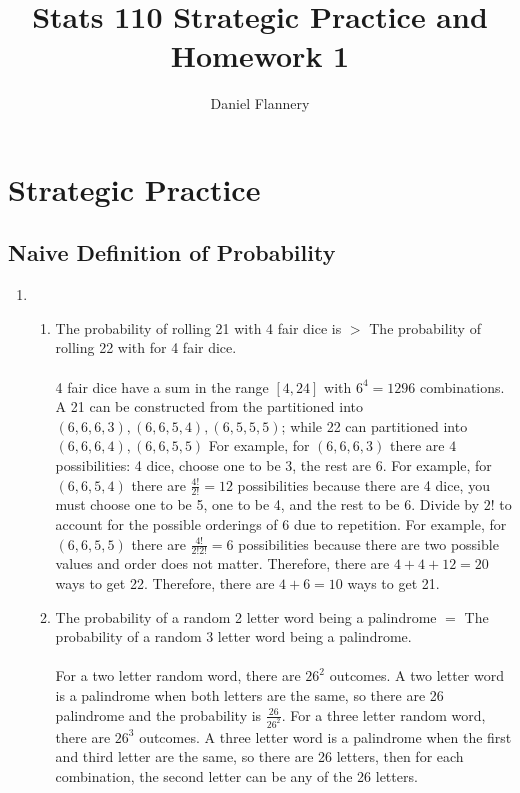 \documentclass[11pt, oneside]{article}   	%
\title{Stats 110 Strategic Practice and Homework 1}
\author{Daniel Flannery}
\begin{document}
\maketitle
\tableofcontents

\section{Strategic Practice}
\subsection{Naive Definition of Probability}
	\begin{enumerate}
		\item 
			\begin{enumerate}
			\item The probability of rolling 21  with 4 fair dice is $>$ The probability of rolling 22 with for 4 fair dice.\\\\
			4 fair dice have a sum in the range $[4, 24]$ with $6^4 = 1296$ combinations.
			A 21 can be constructed from the partitioned into $(6, 6, 6, 3), (6, 6, 5, 4), (6, 5, 5, 5)$; while 22 can partitioned into $(6, 6, 6, 4), (6, 6, 5, 5)$
			For example, for $(6, 6, 6, 3)$ there are $4$ possibilities: 4 dice, choose one to be 3, the rest are 6.
			For example, for $(6, 6, 5, 4)$ there are $\frac{4!}{2!} = 12$ possibilities because there are 4 dice, you must choose one to be 5, one to be 4, and the rest to be 6. Divide by $2!$ to account for the possible orderings of 6 due to repetition.
			For example, for $(6, 6, 5, 5)$ there are $\frac{4!}{2! 2!} = 6$ possibilities because there are two possible values and order does not matter.
			Therefore, there are $4 + 4 + 12 = 20$ ways to get 22.
			Therefore, there are $4 + 6 = 10$ ways to get 21.
			\item The probability of a random 2 letter word being a palindrome $=$ The probability of a random 3 letter word being a palindrome.\\\\
			For a two letter random word, there are $26^2$ outcomes. A two letter word is a palindrome when both letters are the same, so there are 26 palindrome and the probability is $\frac{26}{26^2}$.
			For a three letter random word, there are $26^3$ outcomes. A three letter word is a palindrome when the first and third letter are the same, so there are 26 letters, then for each combination, the second letter can be any of the 26 letters.

\end{enumerate}
\end{enumerate}
\end{document}
